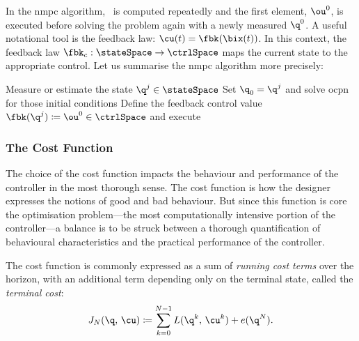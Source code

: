 In the \ac{nmpc} algorithm, \ou\ is computed repeatedly and the first element,
$\ou^0$, is executed before solving the problem again with a newly measured
$\q^0$. A useful notational tool is the feedback law: $\cu(t) = \fbk(\bix(t))$.
In this context, the feedback law $\fbk_c:\stateSpace\rightarrow\ctrlSpace$ maps
the current state to the appropriate control. Let us summarise the \ac{nmpc} algorithm more
precisely: \begin{displayAlgorithm}\label{alg:NMPC-general}\leavevmode%
%
  \begin{algorithmic}[1]
    \Repeat{}
    \State Measure or estimate the state $\q^j\in\stateSpace$
    \State Set $\q_0 = \q^j$ and solve \ac{ocpn} for those initial conditions
    \State Define the feedback control value $\fbk(\q^j) \coloneq \ou^0\in\ctrlSpace$ and execute
  \end{algorithmic}
\end{displayAlgorithm}



\subsubsection{The Cost Function}


The choice of the cost function impacts the behaviour and performance of the
controller in the most thorough sense. The cost function is how the designer
expresses the notions of good and bad behaviour. But since this function is core
the optimisation problem---the most computationally intensive portion of the
controller---a balance is to be struck between a thorough quantification of
behavioural characteristics and the practical performance of the controller.

The cost function is commonly expressed as a sum of
\emph{running cost terms} over the horizon,
with an additional term depending only on the terminal state, called the
\emph{terminal cost}:
%
\begin{equation}\label{eq:costfn-aliased}
  J_N(\q,\, \cu) \coloneq \sum_{k=0}^{N-1} L(\q^k,\,\cu^k) + e(\q^N).
\end{equation}



